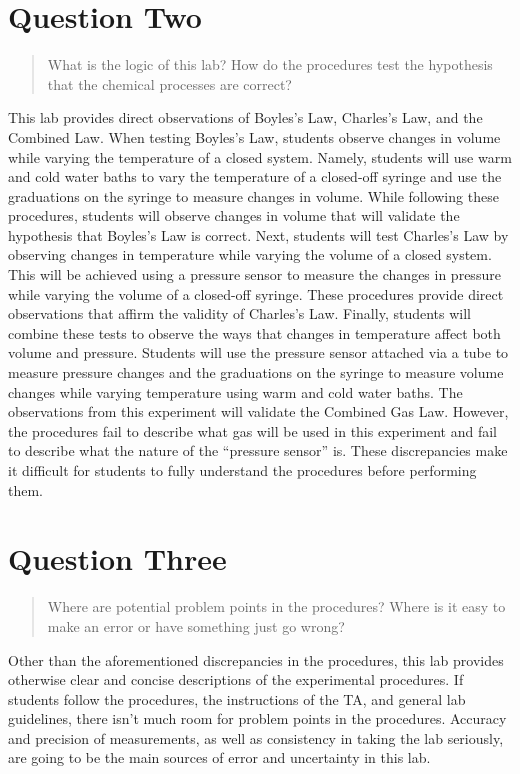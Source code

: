 \documentclass[11pt, letterpaper]{article}
\begin{document}
\section{Question Two}
\begin{quote}
    What is the logic of this lab? How do the procedures test the hypothesis that the chemical 
    processes are correct?
\end{quote}

This lab provides direct observations of Boyles's Law, Charles's Law, and the Combined Law.
When testing Boyles's Law, students observe changes in volume while varying the temperature 
of a closed system.
Namely, students will use warm and cold water baths to vary the temperature of a closed-off
syringe and use the graduations on the syringe to measure changes in volume.
While following these procedures, students will observe changes in volume that will validate
the hypothesis that Boyles's Law is correct.
Next, students will test Charles's Law by observing changes in temperature while varying
the volume of a closed system.
This will be achieved using a pressure sensor to measure the changes in pressure while
varying the volume of a closed-off syringe.
These procedures provide direct observations that affirm the validity of Charles's Law.
Finally, students will combine these tests to observe the ways that changes in temperature 
affect both volume and pressure.
Students will use the pressure sensor attached via a tube to measure pressure changes and
the graduations on the syringe to measure volume changes while varying temperature using
warm and cold water baths.
The observations from this experiment will validate the Combined Gas Law.
However, the procedures fail to describe what gas will be used in this experiment and fail
to describe what the nature of the ``pressure sensor'' is. 
These discrepancies make it difficult for students to fully understand the procedures before
performing them.

\section{Question Three}
\begin{quote}
    Where are potential problem points in the procedures? Where is it easy to make an error 
    or have something just go wrong?
\end{quote}

Other than the aforementioned discrepancies in the procedures, this lab provides otherwise
clear and concise descriptions of the experimental procedures.
If students follow the procedures, the instructions of the TA, and general lab guidelines,
there isn't much room for problem points in the procedures.
Accuracy and precision of measurements, as well as consistency in taking the lab seriously,
are going to be the main sources of error and uncertainty in this lab.
\end{document}
